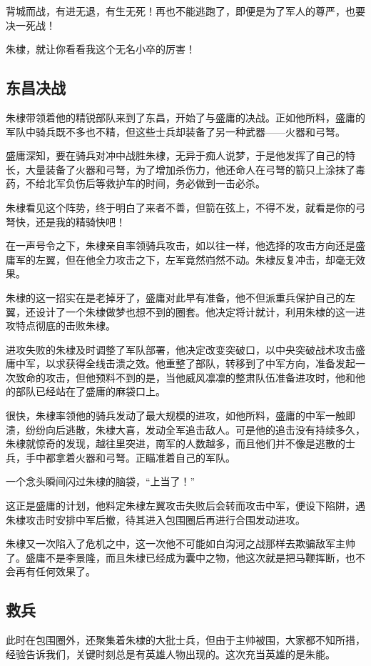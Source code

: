 \begin{multicols}{\theparacolNo}
		背城而战，有进无退，有生无死！再也不能逃跑了，即便是为了军人的尊严，也要决一死战！

		朱棣，就让你看看我这个无名小卒的厉害！

		\subsection{东昌决战}
		朱棣带领着他的精锐部队来到了东昌，开始了与盛庸的决战。正如他所料，盛庸的军队中骑兵既不多也不精，但这些士兵却装备了另一种武器——火器和弓弩。

		盛庸深知，要在骑兵对冲中战胜朱棣，无异于痴人说梦，于是他发挥了自己的特长，大量装备了火器和弓弩，为了增加杀伤力，他还命人在弓弩的箭只上涂抹了毒药，不给北军负伤后等救护车的时间，务必做到一击必杀。

		朱棣看见这个阵势，终于明白了来者不善，但箭在弦上，不得不发，就看是你的弓弩快，还是我的精骑快吧！

		在一声号令之下，朱棣亲自率领骑兵攻击，如以往一样，他选择的攻击方向还是盛庸军的左翼，但在他全力攻击之下，左军竟然岿然不动。朱棣反复冲击，却毫无效果。

		朱棣的这一招实在是老掉牙了，盛庸对此早有准备，他不但派重兵保护自己的左翼，还设计了一个朱棣做梦也想不到的圈套。他决定将计就计，利用朱棣的这一进攻特点彻底的击败朱棣。

		进攻失败的朱棣及时调整了军队部署，他决定改变突破口，以中央突破战术攻击盛庸中军，以求获得全线击溃之效。他重整了部队，转移到了中军方向，准备发起一次致命的攻击，但他预料不到的是，当他威风凛凛的整肃队伍准备进攻时，他和他的部队已经站在了盛庸的麻袋口上。

		很快，朱棣率领他的骑兵发动了最大规模的进攻，如他所料，盛庸的中军一触即溃，纷纷向后逃散，朱棣大喜，发动全军追击敌人。可是他的追击没有持续多久，朱棣就惊奇的发现，越往里突进，南军的人数越多，而且他们并不像是逃散的士兵，手中都拿着火器和弓弩。正瞄准着自己的军队。

		一个念头瞬间闪过朱棣的脑袋，“上当了！”

		这正是盛庸的计划，他料定朱棣左翼攻击失败后会转而攻击中军，便设下陷阱，遇朱棣攻击时安排中军后撤，待其进入包围圈后再进行合围发动进攻。

		朱棣又一次陷入了危机之中，这一次他不可能如白沟河之战那样去欺骗敌军主帅了。盛庸不是李景隆，而且朱棣已经成为囊中之物，他这次就是把马鞭挥断，也不会再有任何效果了。

		\subsection{救兵}
		此时在包围圈外，还聚集着朱棣的大批士兵，但由于主帅被围，大家都不知所措，经验告诉我们，关键时刻总是有英雄人物出现的。这次充当英雄的是朱能。


\end{multicols}

